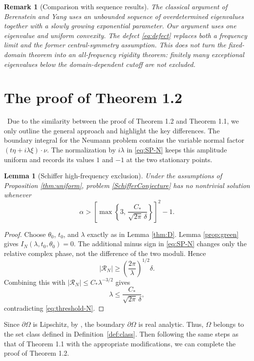 \documentclass[12pt]{article}
\numberwithin{equation}{section}
\newtheorem{lemma}[theorem]{Lemma}
\newtheorem{remark}[theorem]{Remark}
\numberwithin{equation}{section}
\newcommand{\cR}{\mathcal{R}}
\begin{document}
\begin{remark}[Comparison with sequence results]
\emph{The classical argument of Berenstein and Yang \cite{Berenstein2} uses an
unbounded sequence of overdetermined eigenvalues together with a slowly
growing exponential parameter. Our argument uses one eigenvalue and
uniform convexity.  The defect \eqref{eq:defect} replaces both a frequency
limit and the former central-symmetry assumption. This does not turn the
fixed-domain theorem into an all-frequency rigidity theorem: finitely many
exceptional eigenvalues below the domain-dependent cutoff are not excluded.}
\end{remark}

\section{The proof of Theorem 1.2}
\bigskip
\quad\,
Due to the similarity between the proof of Theorem 1.2 and Theorem 1.1, we only outline the general approach and highlight the key differences.
The boundary
integral for the Neumann problem contains the variable normal factor
$(t\eta+i\lambda\xi)\cdot\nu$. The normalization by $i\lambda$ in
\eqref{eq:SP-N} keeps this amplitude uniform and records its values $1$ and
$-1$ at the two stationary points.
\begin{lemma}[Schiffer high-frequency exclusion]\label{thm:N}
Under the assumptions of Proposition \ref{thm:uniform}, problem \eqref{SchifferConjecture}
has no nontrivial solution whenever
\begin{equation}\label{eq:threshold-N}
\alpha>
\left[
\max\left\{
3,\,
\frac{C_*}{\sqrt{2\pi}\,\delta}
\right\}
\right]^2-1.
\end{equation}
\end{lemma}

\begin{proof}
Choose $\theta_0$, $t_0$, and $\lambda$ exactly as in Lemma \ref{thm:D}.
Lemma \ref{prop:green} gives
$I_N(\lambda,t_0,\theta_0)=0$. The additional minus sign in
\eqref{eq:SP-N} changes only the relative complex phase, not the difference
of the two moduli. Hence
\[
|\cR_N|
\ge
\left(\frac{2\pi}{\lambda}\right)^{1/2}
\delta.
\]
Combining this with $|\cR_N|\le C_*\lambda^{-3/2}$ gives
\[
\lambda
\le
\frac{C_*}{\sqrt{2\pi}\,\delta},
\]
contradicting \eqref{eq:threshold-N}.
\end{proof}

Since $\partial \Omega$ is Lipschitz, by \cite{Caffarelli, Williams0, Williams}, the boundary $\partial \Omega$ is real analytic. Thus, $\Omega$ belongs to the set class defined in Definition~\ref{def:class}. Then following the same steps as that of Theorem 1.1 with the appropriate modifications, we can complete the proof of Theorem 1.2.
\end{document}
